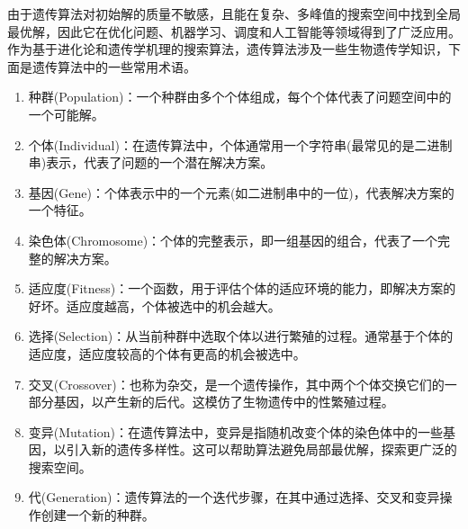由于遗传算法对初始解的质量不敏感，且能在复杂、多峰值的搜索空间中找到全局最优解，因此它在优化问题、机器学习、调度和人工智能等领域得到了广泛应用。
作为基于进化论和遗传学机理的搜索算法，遗传算法涉及一些生物遗传学知识，下面是遗传算法中的一些常用术语。
\begin{enumerate}
  \item 种群(Population)：一个种群由多个个体组成，每个个体代表了问题空间中的一个可能解。

  \item 个体(Individual)：在遗传算法中，个体通常用一个字符串(最常见的是二进制串)表示，代表了问题的一个潜在解决方案。
  
  \item 基因(Gene)：个体表示中的一个元素(如二进制串中的一位)，代表解决方案的一个特征。
  
  \item 染色体(Chromosome)：个体的完整表示，即一组基因的组合，代表了一个完整的解决方案。
  
  \item 适应度(Fitness)：一个函数，用于评估个体的适应环境的能力，即解决方案的好坏。适应度越高，个体被选中的机会越大。
  
  \item 选择(Selection)：从当前种群中选取个体以进行繁殖的过程。通常基于个体的适应度，适应度较高的个体有更高的机会被选中。
  
  \item 交叉(Crossover)：也称为杂交，是一个遗传操作，其中两个个体交换它们的一部分基因，以产生新的后代。这模仿了生物遗传中的性繁殖过程。
  
  \item 变异(Mutation)：在遗传算法中，变异是指随机改变个体的染色体中的一些基因，以引入新的遗传多样性。这可以帮助算法避免局部最优解，探索更广泛的搜索空间。
  
  \item 代(Generation)：遗传算法的一个迭代步骤，在其中通过选择、交叉和变异操作创建一个新的种群。
  \end{enumerate}

